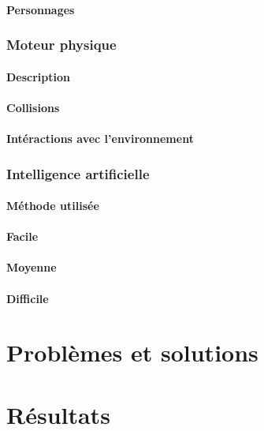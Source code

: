 \documentclass[a4paper,11pt]{report}
\begin{document}
			\subsubsection{Personnages}
			
		\subsection{Moteur physique}
		
			\subsubsection{Description}
		
			\subsubsection{Collisions}
			
			\subsubsection{Intéractions avec l'environnement}
			
		\subsection{Intelligence artificielle}

			\subsubsection{Méthode utilisée}
			
			\subsubsection{Facile}
			
			\subsubsection{Moyenne}
			
			\subsubsection{Difficile}

\chapter{Problèmes et solutions}


\chapter{Résultats}
\end{document}
